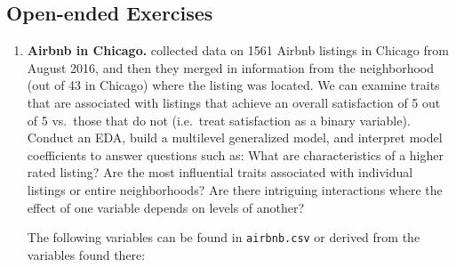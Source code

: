 \documentclass[
]{krantz}
\begin{document}
\hypertarget{open-ended-exercises-6}{%
\subsection{Open-ended Exercises}\label{open-ended-exercises-6}}

\begin{enumerate}
\def\labelenumi{\arabic{enumi}.}
\item
  \textbf{Airbnb in Chicago.} \citet{Trinh2018} collected data on 1561 Airbnb listings in Chicago from August 2016, and then they merged in information from the neighborhood (out of 43 in Chicago) where the listing was located. We can examine traits that are associated with listings that achieve an overall satisfaction of 5 out of 5 vs.~those that do not (i.e.~treat satisfaction as a binary variable). Conduct an EDA, build a multilevel generalized model, and interpret model coefficients to answer questions such as: What are characteristics of a higher rated listing? Are the most influential traits associated with individual listings or entire neighborhoods? Are there intriguing interactions where the effect of one variable depends on levels of another?

  The following variables can be found in \texttt{airbnb.csv} or derived from the variables found there:


\end{enumerate}
\end{document}
